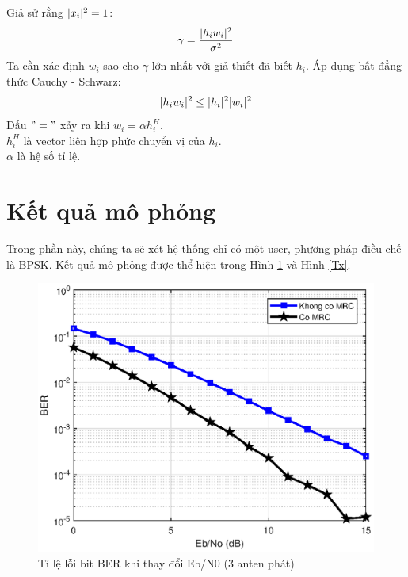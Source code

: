 \documentclass[conference]{IEEEtran}
\DeclarePairedDelimiter\abst{\lvert}{\rvert^2}
\begin{document}
	Giả sử rằng $\abst{x_i} = 1$:
	\begin{equation*}
	\gamma = \frac{\abst{h_iw_i}}{\sigma^2}
	\end{equation*}
	Ta cần xác định $w_i$ sao cho $\gamma$ lớn nhất với giả thiết đã biết $h_i$.
	Áp dụng bất đẳng thức Cauchy - Schwarz:
	\begin{equation*}
	\abst{h_iw_i} \le \abst{h_i} \abst{w_i} 
	\end{equation*}
	Dấu $"="$ xảy ra khi $w_i = \alpha h_i^H$.\\
	$h_i^H$ là vector liên hợp phức chuyển vị của $h_i$.\\
	$\alpha$ là hệ số tỉ lệ.
	\section{Kết quả mô phỏng}
	Trong phần này, chúng ta sẽ xét hệ thống chỉ có một user, phương pháp điều chế là BPSK. Kết quả mô phỏng được thể hiện trong Hình \ref{EbN0} và Hình \ref{Tx}.\\
	\begin{figure}[h]
		\includegraphics[width=\linewidth]{Figures/EbN0}
		\caption{Tỉ lệ lỗi bit BER khi thay đổi Eb/N0 (3 anten phát) }
		\label{EbN0}
	\end{figure} 
\end{document}
